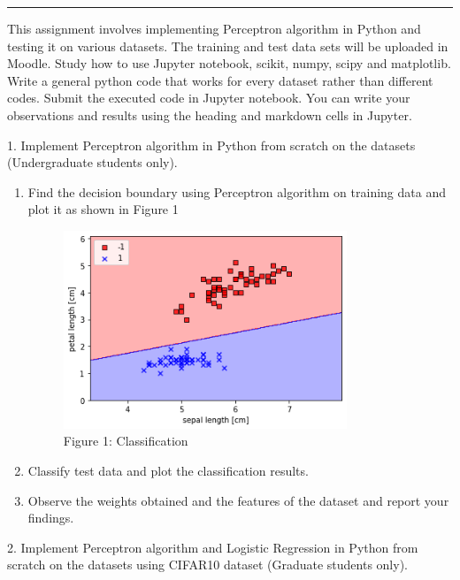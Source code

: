 \documentclass[11pt]{article}
\begin{document}
\Large
{}
\medskip\hrule

\vspace{20pt}
This assignment involves implementing Perceptron algorithm in Python and testing it on various datasets. The training and test data sets will be uploaded in Moodle. Study how to use Jupyter notebook, scikit, numpy, scipy and matplotlib. Write a general python code that works for every dataset rather than different codes. Submit the executed code in Jupyter notebook. You can write your observations and results using the heading and markdown cells in Jupyter.

\vspace{20pt}
1. Implement Perceptron algorithm in Python from scratch on the datasets (Undergraduate students only).

\begin{enumerate}
\item   Find the decision boundary using Perceptron algorithm on training data and plot it as shown in Figure 1
\begin{figure}[h]
    \centering
    \includegraphics[width=0.8\textwidth]{code/output.png}
    \caption{Figure 1: Classification}
\end{figure}
\item Classify test data and plot the classification results.
\item Observe the weights obtained and the features of the dataset and report your findings.
\end{enumerate}

\vspace{20pt}


2. Implement Perceptron algorithm and Logistic Regression in Python from scratch on the datasets using CIFAR10 dataset (Graduate students only).
\end{document}
